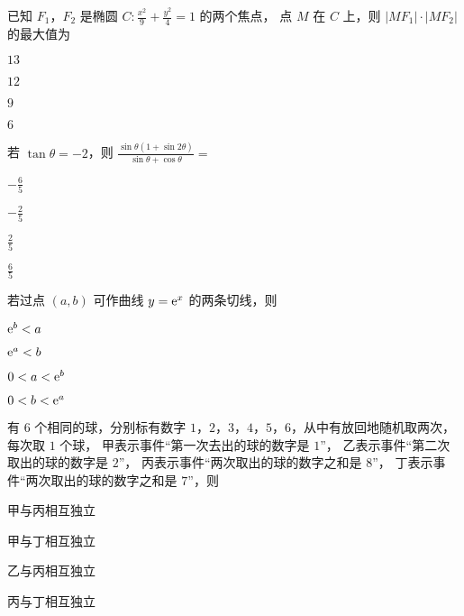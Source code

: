 \documentclass{exam-zh}
\begin{document}
\begin{question}
  已知 $F_1$，$F_2$ 是椭圆 $C \colon \frac{x^2}{9} + \frac{y^2}{4} = 1$ 的两个焦点，
  点 $M$ 在 $C$ 上，则 $|M F_1| \cdot |M F_2|$ 的最大值为 \paren
  \begin{choices}
    \item $13$
    \item $12$
    \item $9$
    \item $6$
  \end{choices}
\end{question}

\begin{question}
  若 $\tan\theta = -2$，则 $\frac{\sin\theta (1 + \sin 2\theta)}{\sin\theta + \cos\theta} = $ \paren
  \begin{choices}
    \item $-\frac{6}{5}$
    \item $-\frac{2}{5}$
    \item $\frac{2}{5}$
    \item $\frac{6}{5}$
  \end{choices}
\end{question}

\begin{question}
  若过点 $(a, b)$ 可作曲线 $y = \mathrm{ e }^x$ 的两条切线，则 \paren
  \begin{choices}
    \item $\mathrm{ e }^b < a$
    \item $\mathrm{ e }^a < b$
    \item $0 < a < \mathrm{ e }^b$
    \item $0 < b < \mathrm{ e }^a$
  \end{choices}
\end{question}

\begin{question}
  有 $6$ 个相同的球，分别标有数字 $1$，$2$，$3$，$4$，$5$，$6$，从中有放回地随机取两次，每次取 $1$ 个球，
  甲表示事件“第一次去出的球的数字是 $1$”，
  乙表示事件“第二次取出的球的数字是 $2$”，
  丙表示事件“两次取出的球的数字之和是 $8$”，
  丁表示事件“两次取出的球的数字之和是 $7$”，则 \paren
  \begin{choices}
    \item 甲与丙相互独立
    \item 甲与丁相互独立
    \item 乙与丙相互独立
    \item 丙与丁相互独立
  \end{choices}
\end{question}
\end{document}
